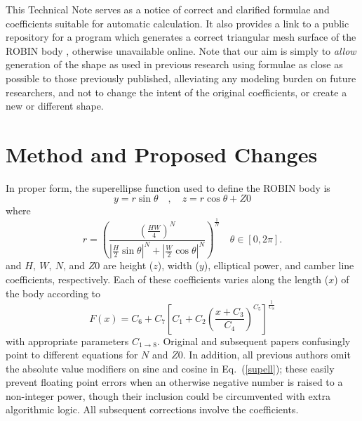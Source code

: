 \documentclass[12pt]{article}
\begin{document}
This Technical Note serves as a notice of correct and clarified formulae and coefficients
suitable for automatic calculation.
It also provides a link to a public repository for a program which generates a correct
triangular mesh surface of the ROBIN body \cite{robinsurfmesh}, otherwise unavailable online.
Note that our aim is simply to \emph{allow} generation of the shape as used in previous research
using formulae as close as possible to those previously published,
alleviating any modeling burden on future researchers,
and not to change the intent of the original coefficients, or create a new or different shape.


\section{Method and Proposed Changes}
In proper form, the superellipse function used to define the ROBIN body is
\begin{equation}
   y=r \sin \theta \quad , \quad z=r \cos \theta +Z0
\end{equation} 
where
\begin{equation}
  r=\left(\frac{\left(\frac{HW}{4}\right)^{N}}{|\frac{H}{2}\sin \theta|^{N}+|\frac{W}{2}\cos \theta|^{N}}\right)^{\frac{1}{N}} \quad \theta\in[0,2\pi].
\label{supell}
\end{equation}
and $H, \ W, \ N$, and $Z0$ are height ($z$), width ($y$), elliptical power, and camber line coefficients,
respectively.
Each of these coefficients varies along the length ($x$) of the body according to
\begin{equation}
  F\!\left(x\right) = C_{6}+C_{7}\left[C_{1}+C_{2}\left(\frac{x+C_{3}}{C_{4}}\right)^{C_{5}}\right]^{\frac{1}{C_{8}}}
\label{coeff}
\end{equation}
with appropriate parameters $C_{1 \to 8}$.
Original \cite{nasa80051} and subsequent \cite{nasa87762} papers confusingly point to different equations
for $N$ and $Z0$.
In addition, all previous authors omit the absolute value modifiers on sine and cosine in Eq.~(\ref{supell});
these easily prevent floating point errors when an otherwise negative number is raised to a non-integer power,
though their inclusion could be circumvented with extra algorithmic logic.  
All subsequent corrections involve the coefficients.
\end{document}
